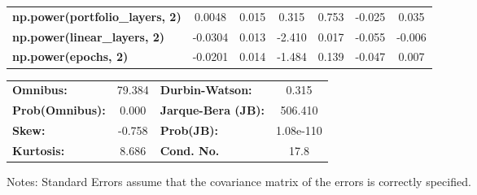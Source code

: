 \begin{center}
\begin{tabular}{lcccccc}
\textbf{np.power(portfolio\_layers, 2)}    &       0.0048  &        0.015     &     0.315  &         0.753        &       -0.025    &        0.035     \\
\textbf{np.power(linear\_layers, 2)}       &      -0.0304  &        0.013     &    -2.410  &         0.017        &       -0.055    &       -0.006     \\
\textbf{np.power(epochs, 2)}               &      -0.0201  &        0.014     &    -1.484  &         0.139        &       -0.047    &        0.007     \\
\bottomrule
\end{tabular}
\begin{tabular}{lclc}
\textbf{Omnibus:}       & 79.384 & \textbf{  Durbin-Watson:     } &     0.315  \\
\textbf{Prob(Omnibus):} &  0.000 & \textbf{  Jarque-Bera (JB):  } &   506.410  \\
\textbf{Skew:}          & -0.758 & \textbf{  Prob(JB):          } & 1.08e-110  \\
\textbf{Kurtosis:}      &  8.686 & \textbf{  Cond. No.          } &      17.8  \\
\bottomrule
\end{tabular}
\end{center}

Notes: \newline
 [1] Standard Errors assume that the covariance matrix of the errors is correctly specified.